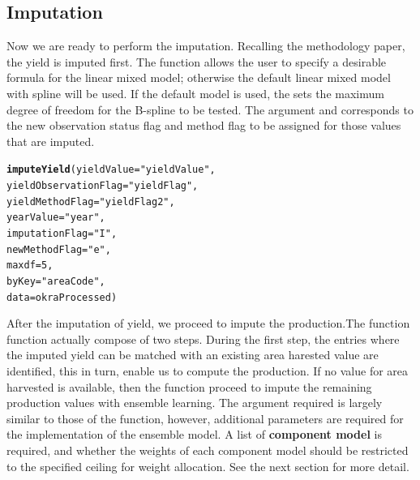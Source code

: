 \documentclass[nojss]{jss}\usepackage[]{graphicx}\usepackage[]{color}
\makeatletter
\newcommand{\hlnum}[1]{\textcolor[rgb]{0.686,0.059,0.569}{#1}}%
\newcommand{\hlstr}[1]{\textcolor[rgb]{0.192,0.494,0.8}{#1}}%
\newcommand{\hlstd}[1]{\textcolor[rgb]{0.345,0.345,0.345}{#1}}%
\newcommand{\hlkwc}[1]{\textcolor[rgb]{0.333,0.667,0.333}{#1}}%
\newcommand{\hlkwd}[1]{\textcolor[rgb]{0.737,0.353,0.396}{\textbf{#1}}}%
\newenvironment{kframe}{%
 \def\at@end@of@kframe{}%
 \ifinner\ifhmode%
  \def\at@end@of@kframe{\end{minipage}}%
  \begin{minipage}{\columnwidth}%
 \fi\fi%
 \def\FrameCommand##1{\hskip\@totalleftmargin \hskip-\fboxsep
 \colorbox{shadecolor}{##1}\hskip-\fboxsep
     \hskip-\linewidth \hskip-\@totalleftmargin \hskip\columnwidth}%
 \MakeFramed {\advance\hsize-\width
   \@totalleftmargin\z@ \linewidth\hsize
   \@setminipage}}%
 {\par\unskip\endMakeFramed%
 \at@end@of@kframe}
\newenvironment{knitrout}{}{} %
\makeatother
\begin{document}
\subsection{Imputation}

Now we are ready to perform the imputation. Recalling the methodology
paper, the yield is imputed first. The function 
allows the user to specify a desirable formula for the linear mixed
model; otherwise the default linear mixed model with spline will be
used. If the default model is used, the  sets the maximum
degree of freedom for the B-spline to be tested. The argument
 and  corresponds to the new
observation status flag and method flag to be assigned for those
values that are imputed.


\begin{knitrout}
\color{fgcolor}\begin{kframe}
\begin{alltt}
\hlkwd{imputeYield}\hlstd{(}\hlkwc{yieldValue} \hlstd{=} \hlstr{"yieldValue"}\hlstd{,}
            \hlkwc{yieldObservationFlag} \hlstd{=} \hlstr{"yieldFlag"}\hlstd{,}
            \hlkwc{yieldMethodFlag} \hlstd{=} \hlstr{"yieldFlag2"}\hlstd{,}
            \hlkwc{yearValue} \hlstd{=} \hlstr{"year"}\hlstd{,}
            \hlkwc{imputationFlag} \hlstd{=} \hlstr{"I"}\hlstd{,}
            \hlkwc{newMethodFlag} \hlstd{=} \hlstr{"e"}\hlstd{,}
            \hlkwc{maxdf} \hlstd{=} \hlnum{5}\hlstd{,}
            \hlkwc{byKey} \hlstd{=} \hlstr{"areaCode"}\hlstd{,}
            \hlkwc{data} \hlstd{= okraProcessed)}
\end{alltt}
\end{kframe}
\end{knitrout}


After the imputation of yield, we proceed to impute the production.The
function  function actually compose of two
steps. During the first step, the entries where the imputed yield can
be matched with an existing area harested value are identified, this
in turn, enable us to compute the production. If no value for area
harvested is available, then the function proceed to impute the
remaining production values with ensemble learning. The argument
required is largely similar to those of the 
function, however, additional parameters are required for the
implementation of the ensemble model. A list of \textbf{component
  model} is required, and whether the weights of each component model
should be restricted to the specified ceiling for weight
allocation. See the next section for more detail.
\end{document}

